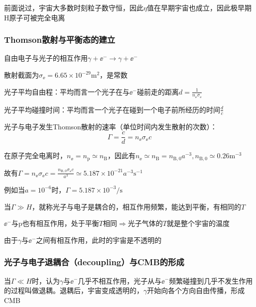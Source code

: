 \par 
前面说过，宇宙大多数时刻粒子数守恒，因此$\eta$值在早期宇宙也成立，因此极早期H原子可被完全电离

\subsubsection{Thomson散射与平衡态的建立}
\par 
自由电子与光子的相互作用$\gamma + \ee^{-} \rightarrow \gamma + \ee^{-}$
\par 
散射截面为$\sigma_{\ee} = 6.65 \times 10^{-29} \mathrm{m^2}$，是常数
\par 
光子平均自由程：平均而言一个光子在与$\ee^{-}$碰前走的距离$d = \frac{1}{n_{\ee} \sigma_{\ee}}$
\par 
光子平均碰撞时间：平均而言一个光子在碰到一个电子前所经历的时间$\frac{d}{c}$
\par 
光子与电子发生Thomson散射的速率（单位时间内发生散射的次数）：
\begin{equation}
	\Gamma = \frac{c}{d} = n_{\ee} \sigma_{\ee} c
\end{equation}
\par 
在原子完全电离时，$n_{\ee} = n_{\mathrm{p}} \simeq n_{\mathrm{B}}$，因此有$n_{\ee} \simeq n_{\mathrm{B}} = n_{\mathrm{B}, 0} a^{-3}, n_{\mathrm{B}, 0} \simeq 0.26 \mathrm{m^{-3}}$
\par 
故有$\Gamma = n_{\ee} \sigma_{\ee} c = \frac{ n_{\mathrm{B}, 0} \sigma_{\ee} c}{a^3} \simeq 5.187 \times 10^{-21} a^{-3} \mathrm{s^{-1}}$
\par 
例如当$a = 10^{-6}$时，$\Gamma = 5.187 \times 10^{-3} \mathrm{/s}$
\par 
当$\Gamma \gg H$，就称光子与电子是耦合的，相互作用频繁，能达到平衡，有相同的$T$
\par
$\ee^{-}$与p也有相互作用，处于平衡$T$相同$\Rightarrow$光子气体的$T$就是整个宇宙的温度
\par 
由于$\gamma$与$\ee^{-}$之间有相互作用，此时的宇宙是不透明的

\subsubsection{光子与电子退耦合（decoupling）与CMB的形成}
\par 
当$\Gamma \ll H$时，认为$\gamma$与$\ee^{-}$几乎不相互作用，光子从与$\ee^{-}$频繁碰撞到几乎不发生作用的过程叫做退耦。退耦后，宇宙变成透明的，$\gamma$开始向各个方向自由传播，形成CMB






